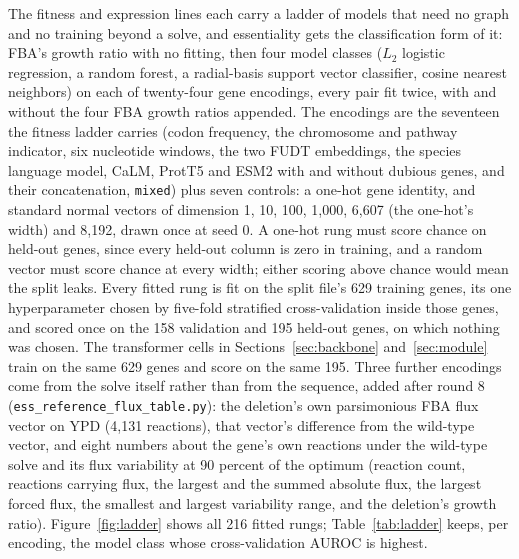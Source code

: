 The fitness and expression lines each carry a ladder of models that need no graph and no
training beyond a solve, and essentiality gets the classification form of it: FBA's growth
ratio with no fitting, then four model classes ($L_2$ logistic regression, a random
forest, a radial-basis support vector classifier, cosine nearest neighbors) on each of
twenty-four gene encodings, every pair fit twice, with and without the four FBA growth
ratios appended. The encodings are the seventeen the fitness ladder carries (codon
frequency, the chromosome and pathway indicator, six nucleotide windows, the two FUDT
embeddings, the species language model, CaLM, ProtT5 and ESM2 with and without dubious
genes, and their concatenation, \texttt{mixed}) plus seven controls: a one-hot gene
identity, and standard normal vectors of dimension 1, 10, 100, 1,000, 6,607 (the one-hot's
width) and 8,192, drawn once at seed 0. A one-hot rung must score chance on held-out genes,
since every held-out column is zero in training, and a random vector must score chance at
every width; either scoring above chance would mean the split leaks. Every fitted rung is
fit on the split file's 629 training genes, its one hyperparameter chosen by five-fold
stratified cross-validation inside those genes, and scored once on the 158 validation and
195 held-out genes, on which nothing was chosen. The transformer cells in
Sections~\ref{sec:backbone} and~\ref{sec:module} train on the same 629 genes and score on
the same 195. Three further encodings come from the solve itself rather than from the
sequence, added after round 8 (\texttt{ess\_reference\_flux\_table.py}): the deletion's
own parsimonious FBA flux vector on YPD (4,131 reactions), that vector's difference from
the wild-type vector, and eight numbers about the gene's own reactions under the
wild-type solve and its flux variability at 90 percent of the optimum (reaction count,
reactions carrying flux, the largest and the summed absolute flux, the largest forced
flux, the smallest and largest variability range, and the deletion's growth ratio).
Figure~\ref{fig:ladder} shows all 216 fitted rungs; Table~\ref{tab:ladder} keeps, per
encoding, the model class whose cross-validation AUROC is highest.


